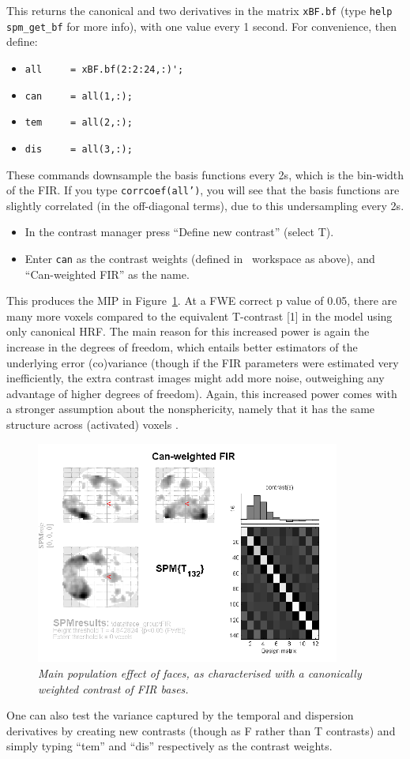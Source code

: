 This returns the canonical and two derivatives in the matrix \texttt{xBF.bf} (type \texttt{help spm\_get\_bf} for more info), with one value every 1 second. For convenience, then define:
\begin{itemize}
\item \verb!all     = xBF.bf(2:2:24,:)';!
\item \verb!can     = all(1,:);!
\item \verb!tem     = all(2,:);!
\item \verb!dis     = all(3,:);!
\end{itemize}

These commands downsample the basis functions every 2s, which is the bin-width of the FIR.
If you type \texttt{corrcoef(all')}, you will see that the basis functions are slightly correlated (in the off-diagonal terms), due to this undersampling every 2s.
\begin{itemize}
\item In the contrast manager press ``Define new contrast'' (select T).
\item Enter \texttt{can} as the contrast weights (defined in \matlab\ workspace as above), and ``Can-weighted FIR'' as the name.
\end{itemize}
This produces the MIP in Figure~\ref{can_weighted_fir}. At a FWE correct p value of 0.05, there are many more voxels compared to the equivalent T-contrast [1] in the model using only canonical HRF. The main reason for this increased power is again the increase in the degrees of freedom, which entails better estimators of the underlying error (co)variance (though if the FIR parameters were estimated very inefficiently, the extra contrast images might add more noise, outweighing any advantage of higher degrees of freedom). Again, this increased power comes with a stronger assumption about the nonsphericity, namely that it has the same structure across (activated) voxels \cite{daniel_hbf2}.
\begin{figure}
\begin{center}
\includegraphics[width=100mm]{faces_group/can_weighted_fir}
\caption{\em Main population effect of faces, as characterised with a canonically weighted contrast of FIR bases. \label{can_weighted_fir}}
\end{center}
\end{figure}
One can also test the variance captured by the temporal and dispersion derivatives by creating new contrasts (though as F rather than T contrasts) and simply typing ``tem'' and ``dis'' respectively as the contrast weights.

